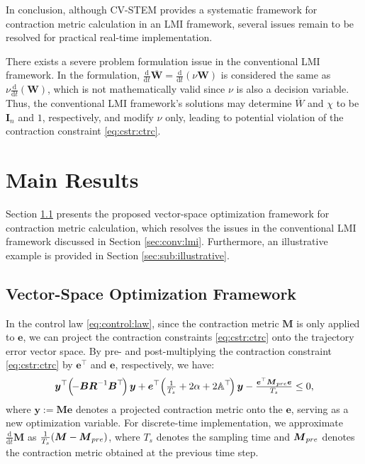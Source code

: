 \documentclass{ifacconf}
\newcommand*{\mv}[1]{\boldsymbol{#1}} %
\newcommand*{\mm}[1]{\boldsymbol{#1}} %
\newcommand\der{\mathrm d}
\newcommand*{\ddtt}{
   \tfrac{\der}{\der t}
}
\begin{document}
In conclusion, although CV-STEM provides a systematic framework for contraction metric calculation in an LMI framework, several issues remain to be resolved for practical real-time implementation.

\begin{rem} \label{rem:scale:invariance}
   There exists a severe problem formulation issue in the conventional LMI framework.
   In the formulation, $\ddtt\overline{\mm{W}}=\ddtt(\nu\mm{W})$ is considered the same as $\nu\ddtt(\mm{W})$, which is not mathematically valid since $\nu$ is also a decision variable.
   Thus, the conventional LMI framework's solutions may determine $\overline{W}$ and $\chi$ to be $\mm{I}_n$ and $1$, respectively, and modify $\nu$ only, leading to potential violation of the contraction constraint \eqref{eq:cstr:ctrc}.
\end{rem}

\section{Main Results} \label{sec:main:results}

Section \ref{sec:sub:vector:space:opt} presents the proposed vector-space optimization framework for contraction metric calculation, which resolves the issues in the conventional LMI framework discussed in Section \ref{sec:conv:lmi}.
Furthermore, an illustrative example is provided in Section \ref{sec:sub:illustrative}.

\subsection{Vector-Space Optimization Framework} \label{sec:sub:vector:space:opt}

In the control law \eqref{eq:control:law}, since the contraction metric $\mm{M}$ is only applied to $\mv{e}$, we can project the contraction constraints \eqref{eq:cstr:ctrc} onto the trajectory error vector space.
By pre- and post-multiplying the contraction constraint \eqref{eq:cstr:ctrc} by $\mv{e}^\top$ and $\mv{e}$, respectively, we have:
\begin{equation} \label{eq:cstr:ctrc:proj}
   \mv{y}^\top 
   \!
   \left(
   \!
      -\mm{B} \mm{R}^{-1} \mm{B}^\top
   \!
   \right)
   \mv{y}
   +
   \mv{e}^\top
   \!
   \left(
      \tfrac{1}{T_s}+2\alpha
      +
      2\mathbb{A}^\top
   \!
   \right)
   \mv{y}
   -
   \tfrac{\mv{e}^\top \mm{M}_{\rm{pre}} \mv{e}}{T_s}
   \le 0
   ,
\end{equation}
where $\mv{y}:=\mm{M}\mv{e}$ denotes a projected contraction metric onto the $\mv{e}$, serving as a new optimization variable.
For discrete-time implementation, we approximate $\ddtt\mm{M}$ as $\tfrac{1}{T_s}(\mm{M}-\mm{M}_{\rm{pre}})$, where $T_s$ denotes the sampling time and $\mm{M}_{\rm{pre}}$ denotes the contraction metric obtained at the previous time step.
\end{document}
